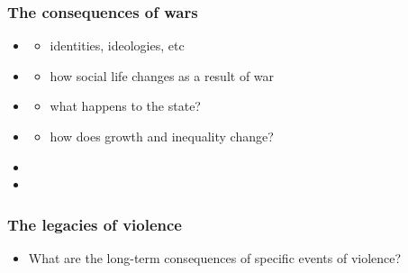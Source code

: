 \documentclass[aspectratio=43]{beamer}
\begin{document}
\begin{frame}
\frametitle{The consequences of wars}
\centering

\begin{itemize}
  \item {}
  \begin{itemize}
    \item identities, ideologies, etc
  \end{itemize}
  \item {}
  \begin{itemize}
    \item how social life changes as a result of war
  \end{itemize}
  \item {}
  \begin{itemize}
    \item what happens to the state?
  \end{itemize}
  \item {}
  \begin{itemize}
    \item how does growth and inequality change?
  \end{itemize}
  \item<5->[]
  \item<5-> 
\end{itemize}

\end{frame}

\begin{frame}
\frametitle{The legacies of violence}
\centering

\begin{itemize}
  \item What are the long-term consequences of specific events of violence?
\end{itemize}

\end{frame}


\end{document}
